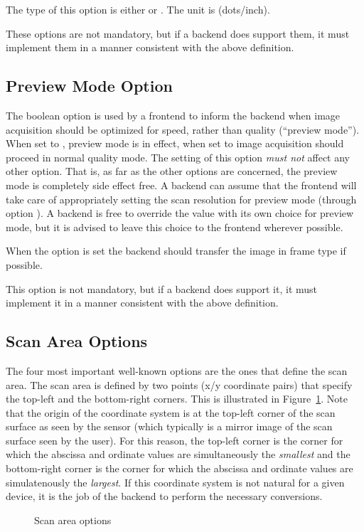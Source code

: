 \documentclass[11pt,DVIps]{report}
\begin{document}
The type of this option is either  or
.  The unit is  (dots/inch).

These options are not mandatory, but if a backend does support them, it
must implement them in a manner consistent with the above definition.

\subsection{Preview Mode Option}

The boolean option  is used by a frontend to inform the
backend when image acquisition should be optimized for speed, rather
than quality (``preview mode'').  When set to ,
preview mode is in effect, when set to  image
acquisition should proceed in normal quality mode.  The setting of
this option \emph{must not\/} affect any other option.  That is, as
far as the other options are concerned, the preview mode is completely
side effect free.  A backend can assume that the frontend will take
care of appropriately setting the scan resolution for preview mode
(through option ).  A backend is free to override the
 value with its own choice for preview mode, but it
is advised to leave this choice to the frontend wherever possible.
\begin{changebar}
When the  option is set the backend should transfer
the image in frame type  if possible.
\end{changebar}

This option is not mandatory, but if a backend does support it, it
must implement it in a manner consistent with the above definition.

\subsection{Scan Area Options\label{subsec:scanarea}}

The four most important well-known options are the ones that define
the scan area.  The scan area is defined by two points (x/y coordinate
pairs) that specify the top-left and the bottom-right corners.  This
is illustrated in Figure~\ref{fig:area}.  Note that the origin of the
coordinate system is at the top-left corner of the scan surface as
seen by the sensor (which typically is a mirror image of the scan
surface seen by the user).  For this reason, the top-left corner is
the corner for which the abscissa and ordinate values are
simultaneously the {\em smallest} and the bottom-right corner is the
corner for which the abscissa and ordinate values are simulatenously
the {\em largest}.  If this coordinate system is not natural for a
given device, it is the job of the backend to perform the necessary
conversions.
\begin{figure}[tbp]
  \begin{center}
    \leavevmode
    \caption{Scan area options}
    \label{fig:area}
  \end{center}
\end{figure}
\end{document}
